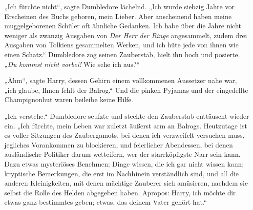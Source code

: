 „Ich fürchte nicht“, sagte Dumbledore lächelnd. „Ich wurde siebzig Jahre vor Erscheinen des Buchs geboren, mein Lieber. Aber anscheinend haben meine muggelgeborenen Schüler oft ähnliche Gedanken. Ich habe über die Jahre nicht weniger als zwanzig Ausgaben von \emph{Der Herr der Ringe} angesammelt, zudem drei Ausgaben von Tolkiens gesammelten Werken, und ich hüte jede von ihnen wie einen Schatz.“ Dumbledore zog seinen Zauberstab, hielt ihn hoch und posierte. „\emph{Du kommst nicht vorbei!} Wie sehe ich aus?“

„Ähm“, sagte Harry, dessen Gehirn einem vollkommenen Aussetzer nahe war, „ich glaube, Ihnen fehlt der Balrog.“ Und die pinken Pyjamas und der eingedellte Champignonhut waren beileibe keine Hilfe.

„Ich verstehe.“ Dumbledore seufzte und steckte den Zauberstab enttäuscht wieder ein. „Ich fürchte, mein Leben war zuletzt äußerst arm an Balrogs. Heutzutage ist es voller Sitzungen des Zaubergamots, bei denen ich verzweifelt versuchen muss, jegliches Vorankommen zu blockieren, und feierlicher Abendessen, bei denen ausländische Politiker darum wetteifern, wer der starrköpfigste Narr sein kann. Dazu etwas mysteriöses Benehmen; Dinge wissen, die ich gar nicht wissen kann; kryptische Bemerkungen, die erst im Nachhinein verständlich sind, und all die anderen Kleinigkeiten, mit denen mächtige Zauberer sich amüsieren, nachdem sie selbst die Rolle des Helden abgegeben haben. Apropos: Harry, ich möchte dir etwas ganz bestimmtes geben; etwas, das deinem Vater gehört hat.“

